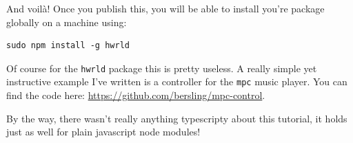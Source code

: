 \documentclass[12pt,a4paper]{article}
\begin{document}
And voilà! Once you publish this, you will be able to install you're
package globally on a machine using:

\begin{lstlisting}
sudo npm install -g hwrld
\end{lstlisting}

Of course for the \texttt{hwrld} package this is pretty useless. A
really simple yet instructive example I've written is a controller for
the \texttt{mpc} music player. You can find the code here:
\url{https://github.com/bersling/mpc-control}.

By the way, there wasn't really anything typescripty about this
tutorial, it holds just as well for plain javascript node modules!
\end{document}
